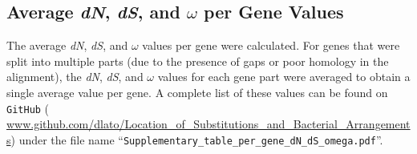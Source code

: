 \documentclass[11pt]{article}
\newcommand{\dn}{\textit{dN}\xspace}
\newcommand{\ds}{\textit{dS}\xspace}
\providecommand{\DIFaddbegin}{} %
\providecommand{\DIFaddend}{} %
\providecommand{\DIFdelbegin}{} %
\providecommand{\DIFdelend}{} %
\begin{document}
		


\DIFaddend \subsection{Average \dn, \ds, and $\omega$ per Gene Values}
The average \dn, \ds, and $\omega$ values per gene were calculated.
For genes that were split into multiple parts (due to the presence of gaps or poor homology in the alignment), the \dn, \ds, and $\omega$ values for each gene part were averaged to obtain a single average value per gene.
\DIFaddbegin \sloppy \DIFaddend A complete list of these values can be found on \texttt{GitHub} (\DIFdelbegin %
\DIFdelend \DIFaddbegin \url{www.github.com/dlato/Location_of_Substitutions_and_Bacterial_Arrangements}\DIFaddend ) under the file name ``\texttt{Supplementary\_table\_per\_gene\_dN\_dS\_omega.pdf}''.
\end{document}
